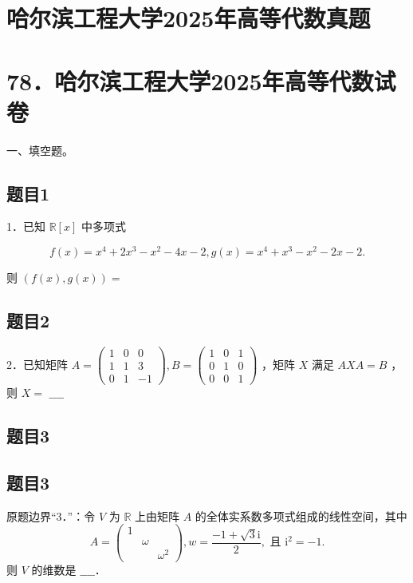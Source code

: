 \documentclass{article}
\begin{document}
\section*{哈尔滨工程大学2025年高等代数真题}
\section*{78．哈尔滨工程大学2025年高等代数试卷}
一、填空题。\\

\subsection{题目1}
1．已知 \(\mathbb{R}[x]\) 中多项式

\[
f(x)=x^{4}+2 x^{3}-x^{2}-4 x-2, g(x)=x^{4}+x^{3}-x^{2}-2 x-2 .
\]

则 \((f(x), g(x))=\)

\subsection{题目2}
2．已知矩阵 \(A=\left(\begin{array}{ccc}1 & 0 & 0 \\ 1 & 1 & 3 \\ 0 & 1 & -1\end{array}\right), B=\left(\begin{array}{lll}1 & 0 & 1 \\ 0 & 1 & 0 \\ 0 & 0 & 1\end{array}\right)\) ，矩阵 \(X\) 满足 \(A X A=B\) ，则 \(X=\) \(\_\_\_\_\)

\begin{itemize}

\subsection{题目3}
\end{itemize}

\subsection{题目3}
原题边界“3．”：令 \(V\) 为 \(\mathbb{R}\) 上由矩阵 \(A\) 的全体实系数多项式组成的线性空间，其中
\[
A=\left(\begin{array}{ccc}
1 & & \\
& \omega & \\
& & \omega^{2}
\end{array}\right), w=\frac{-1+\sqrt{3} \mathrm{i}}{2}, \text { 且 } \mathrm{i}^{2}=-1 .
\]
则 \(V\) 的维数是 \(\_\_\_\_\)．
\end{document}
